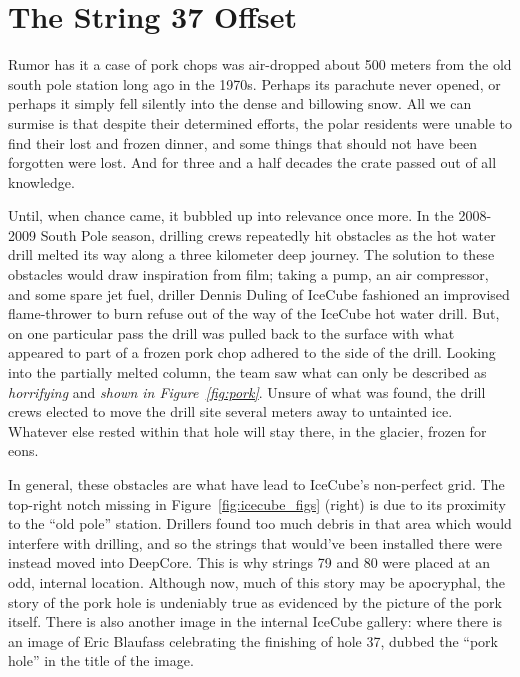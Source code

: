 \documentclass[main.tex]{subfiles}
\begin{document}
\section{The String 37 Offset}\label{app:pork}

Rumor has it a case of pork chops was air-dropped about 500 meters from the old south pole station long ago in the 1970s. 
Perhaps its parachute never opened, or perhaps it simply fell silently into the dense and billowing snow. 
All we can surmise is that despite their determined efforts, the polar residents were unable to find their lost and frozen dinner, and some things that should not have been forgotten were lost. 
And for three and a half decades the crate passed out of all knowledge. 

Until, when chance came, it bubbled up into relevance once more.
In the 2008-2009 South Pole season, drilling crews repeatedly hit obstacles as the hot water drill melted its way along a three kilometer deep journey. 
The solution to these obstacles would draw inspiration from film; taking a pump, an air compressor, and some spare jet fuel, driller Dennis Duling of IceCube fashioned an improvised flame-thrower to burn refuse out of the way of the IceCube hot water drill. 
But, on one particular pass the drill was pulled back to the surface with what appeared to part of a frozen pork chop adhered to the side of the drill. 
Looking into the partially melted column, the team saw what can only be described as \textit{horrifying} and \textit{shown in Figure~\ref{fig:pork}}. 
Unsure of what was found, the drill crews elected to move the drill site several meters away to untainted ice. 
Whatever else rested within that hole will stay there, in the glacier, frozen for eons.


In general, these obstacles are what have lead to IceCube's non-perfect grid. The top-right notch missing in Figure~\ref{fig:icecube_figs} (right) is due to its proximity to the ``old pole'' station. 
Drillers found too much debris in that area which would interfere with drilling, and so the strings that would've been installed there were instead moved into DeepCore.
This is why strings 79 and 80 were placed at an odd, internal location. 
Although now, much of this story may be apocryphal, the story of the pork hole is undeniably true as evidenced by the picture of the pork itself. 
There is also another image in the internal IceCube gallery: where there is an image of Eric Blaufass celebrating the finishing of hole 37, dubbed the ``pork hole'' in the title of the image.
\end{document}
